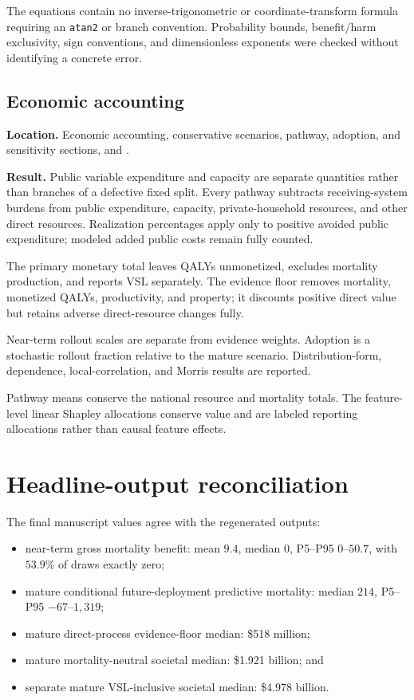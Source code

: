 \documentclass[10pt]{article}
\newcommand{\USD}{\$}
\begin{document}
The equations contain no inverse-trigonometric or coordinate-transform formula
requiring an \texttt{atan2} or branch convention.  Probability bounds,
benefit/harm exclusivity, sign conventions, and dimensionless exponents were
checked without identifying a concrete error.

\subsection*{Economic accounting}

\textbf{Location.} Economic accounting, conservative scenarios, pathway,
adoption, and sensitivity sections, and
.

\textbf{Result.} Public variable expenditure and capacity are separate
quantities rather than branches of a defective fixed split.  Every pathway
subtracts receiving-system burdens from public expenditure, capacity,
private-household resources, and other direct resources.  Realization
percentages apply only to positive avoided public expenditure; modeled added
public costs remain fully counted.

The primary monetary total leaves QALYs unmonetized, excludes mortality
production, and reports VSL separately.  The evidence floor removes mortality,
monetized QALYs, productivity, and property; it discounts positive direct value
but retains adverse direct-resource changes fully.

Near-term rollout scales are separate from
evidence weights.  Adoption is a stochastic rollout fraction relative to the
mature scenario.  Distribution-form, dependence, local-correlation, and Morris
results are reported.

Pathway means conserve the national resource and mortality totals.  The
feature-level linear Shapley allocations conserve value and are labeled
reporting allocations rather than causal feature effects.

\section*{Headline-output reconciliation}

The final manuscript values agree with the regenerated outputs:
\begin{itemize}
\item near-term gross mortality benefit: mean $9.4$, median $0$, P5--P95
$0$--$50.7$, with $53.9\%$ of draws exactly zero;
\item mature conditional future-deployment predictive mortality: median $214$,
P5--P95 $-67$--$1{,}319$;
\item mature direct-process evidence-floor median: \USD518 million;
\item mature mortality-neutral societal median: \USD1.921 billion; and
\item separate mature VSL-inclusive societal median: \USD4.978 billion.
\end{itemize}
\end{document}
